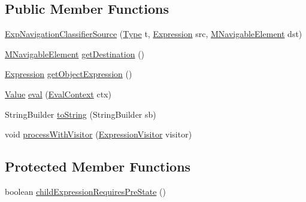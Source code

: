 \subsection*{Public Member Functions}
\begin{DoxyCompactItemize}
\item 
\hyperlink{classorg_1_1tzi_1_1use_1_1uml_1_1ocl_1_1expr_1_1_exp_navigation_classifier_source_af07df506ae727327f3454a179243d882}{Exp\-Navigation\-Classifier\-Source} (\hyperlink{interfaceorg_1_1tzi_1_1use_1_1uml_1_1ocl_1_1type_1_1_type}{Type} t, \hyperlink{classorg_1_1tzi_1_1use_1_1uml_1_1ocl_1_1expr_1_1_expression}{Expression} src, \hyperlink{interfaceorg_1_1tzi_1_1use_1_1uml_1_1mm_1_1_m_navigable_element}{M\-Navigable\-Element} dst)
\item 
\hyperlink{interfaceorg_1_1tzi_1_1use_1_1uml_1_1mm_1_1_m_navigable_element}{M\-Navigable\-Element} \hyperlink{classorg_1_1tzi_1_1use_1_1uml_1_1ocl_1_1expr_1_1_exp_navigation_classifier_source_a9fccf9ace0305531da430a31c63ee3ac}{get\-Destination} ()
\item 
\hyperlink{classorg_1_1tzi_1_1use_1_1uml_1_1ocl_1_1expr_1_1_expression}{Expression} \hyperlink{classorg_1_1tzi_1_1use_1_1uml_1_1ocl_1_1expr_1_1_exp_navigation_classifier_source_afe3f961797710e51de06eb27d88f59b4}{get\-Object\-Expression} ()
\item 
\hyperlink{classorg_1_1tzi_1_1use_1_1uml_1_1ocl_1_1value_1_1_value}{Value} \hyperlink{classorg_1_1tzi_1_1use_1_1uml_1_1ocl_1_1expr_1_1_exp_navigation_classifier_source_abb54f13607436a5102acf6e78c39dc0a}{eval} (\hyperlink{classorg_1_1tzi_1_1use_1_1uml_1_1ocl_1_1expr_1_1_eval_context}{Eval\-Context} ctx)
\item 
String\-Builder \hyperlink{classorg_1_1tzi_1_1use_1_1uml_1_1ocl_1_1expr_1_1_exp_navigation_classifier_source_aa9ba035c0f9a6d1d839e282082ecaef0}{to\-String} (String\-Builder sb)
\item 
void \hyperlink{classorg_1_1tzi_1_1use_1_1uml_1_1ocl_1_1expr_1_1_exp_navigation_classifier_source_af6477ffeeaed11871effdd40af33d68f}{process\-With\-Visitor} (\hyperlink{interfaceorg_1_1tzi_1_1use_1_1uml_1_1ocl_1_1expr_1_1_expression_visitor}{Expression\-Visitor} visitor)
\end{DoxyCompactItemize}
\subsection*{Protected Member Functions}
\begin{DoxyCompactItemize}
\item 
boolean \hyperlink{classorg_1_1tzi_1_1use_1_1uml_1_1ocl_1_1expr_1_1_exp_navigation_classifier_source_ab060150ea9466da4e1301eb62779351d}{child\-Expression\-Requires\-Pre\-State} ()
\end{DoxyCompactItemize}


